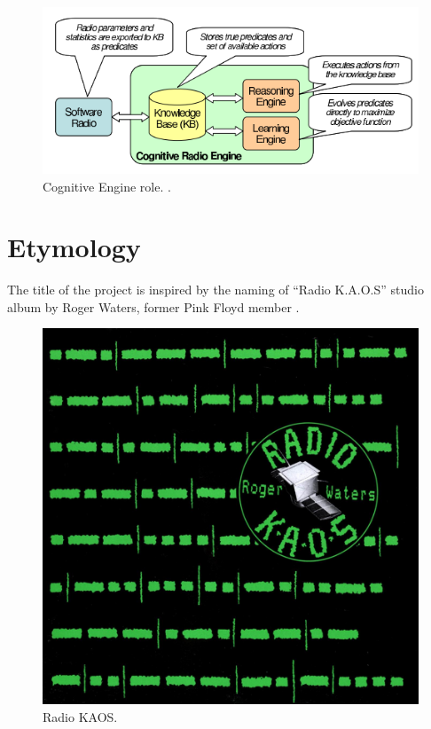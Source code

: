 \documentclass[]{scrartcl}
\begin{document}
\begin{enumerate}
\begin{figure}[H]
\begin{center}
  \includegraphics[scale=0.75]{engine.png}
  \caption{Cognitive Engine role. \cite{planning}.}
\end{center}
\end{figure}

\end{enumerate}

\section{Etymology}

The title of the project is inspired by the naming of ``Radio K.A.O.S''
studio album by Roger Waters, former Pink Floyd member \cite{kaos}.

\begin{figure}[H]
\begin{center}
  \includegraphics[scale=0.2]{kaos.jpg}
  \caption{Radio KAOS.}
\end{center}
\end{figure}
\end{document}
